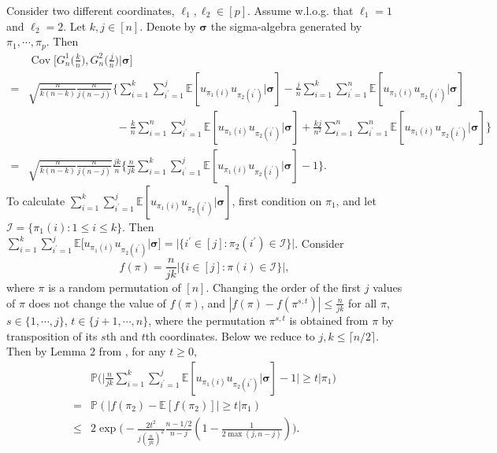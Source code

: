 \documentclass[10pt]{article}
\def\bsigma{\boldsymbol{\sigma}}
\def\E{\mathbb{E}}
\def\P{\mathbb{P}}
\theoremstyle{definition}
\theoremstyle{remark}
\begin{document}
Consider two different coordinates, $\ell_1, \ell_2 \in [p]$. Assume w.l.o.g. that $\ell_1 = 1$ and $\ell_2 = 2$. Let $k,j \in [n]$. Denote by $\bsigma$ the sigma-algebra generated by $\pi_1, \cdots, \pi_p$. Then
\begin{align*}
    & \operatorname{Cov} \bigg[G_n^1\bigg(\frac{k}{n}\bigg), G_n^2\bigg(\frac{j}{n}\bigg)\bigg| \bsigma \bigg] \\
    = & \sqrt{\frac{n}{k(n-k)} \frac{n}{j(n-j)}} \bigg\{\sum_{i = 1}^k \sum_{i^\prime = 1}^j \E[u_{\pi_1(i)} u_{\pi_2(i^{\prime})}|\bsigma] - \frac{j}{n} \sum_{i = 1}^k \sum_{i^{\prime} = 1}^n \E[u_{\pi_1(i)} u_{\pi_2(i^{\prime})}|\bsigma]  \\
    & \qquad \qquad \qquad \qquad - \frac{k}{n}\sum_{i = 1}^n\sum_{i^{\prime} = 1}^j \E[u_{\pi_1(i)} u_{\pi_2(i^{\prime})}|\bsigma] + \frac{kj}{n^2} \sum_{i =1}^n \sum_{i^{\prime} = 1}^n \E[u_{\pi_1(i)} u_{\pi_2(i^{\prime})}|\bsigma]\bigg\} \\
    = & \sqrt{\frac{n}{k(n-k)} \frac{n}{j(n-j)}} \frac{jk}{n}\bigg\{\frac{n}{jk}\sum_{i = 1}^k \sum_{i^\prime = 1}^j \E[u_{\pi_1(i)} u_{\pi_2(i^{\prime})}|\bsigma] - 1\bigg\}.
\end{align*}
To calculate $\sum_{i = 1}^k \sum_{i^\prime = 1}^j \E[u_{\pi_1(i)} u_{\pi_2(i^{\prime})}|\bsigma]$, first condition on $\pi_1$, and let $\mathcal{I} = \{\pi_1(i): 1 \leq i \leq k\}$. Then $\sum_{i = 1}^k \sum_{i^\prime = 1}^j \E[u_{\pi_1(i)} u_{\pi_2(i^{\prime})}|\bsigma] = |\{i^{\prime} \in [j]: \pi_2(i^{\prime}) \in \mathcal{I}\}|$. Consider $$f(\pi) = \frac{n}{jk}|\{i \in [j]: \pi(i) \in \mathcal{I}\}|,$$ where $\pi$ is a random permutation of $[n]$. Changing the order of the first $j$ values of $\pi$ does not change the value of $f(\pi)$, and $|f(\pi) - f(\pi^{s,t})| \leq \frac{n}{jk}$ for all $\pi$, $s \in \{1,\cdots,j\}$, $t \in \{j+1,\cdots,n\}$, where the permutation $\pi^{s,t}$ is obtained from $\pi$ by transposition of its $s$th and $t$th coordinates. Below we reduce to $j,k \leq \lceil n/2 \rceil$. Then by Lemma 2 from \cite{el2009transductive}, for any $t \geq 0$,
\begin{align*}
    & \P\bigg(\bigg|\frac{n}{jk}\sum_{i = 1}^k \sum_{i^\prime = 1}^j \E[u_{\pi_1(i)} u_{\pi_2(i^{\prime})}|\bsigma] - 1 \bigg| \geq t \bigg|\pi_1\bigg) \\
    = & \P(|f(\pi_2) - \E[f(\pi_2)]| \geq t|\pi_1) \\
    \leq & 2 \exp \bigg(- \frac{2 t^2}{j (\frac{n}{jk})^2} \frac{n - 1/2}{n - j}(1 - \frac{1}{2 \max(j,n-j)})\bigg).
\end{align*}
\end{document}
